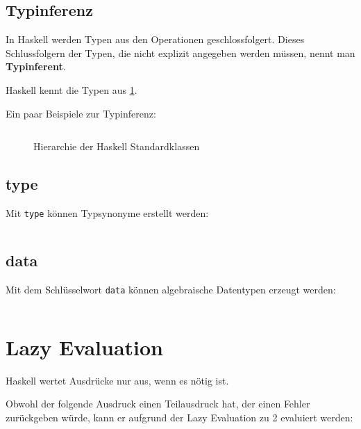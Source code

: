 \subsection{Typinferenz}
In Haskell werden Typen aus den Operationen geschlossfolgert. Dieses
Schlussfolgern der Typen, die nicht explizit angegeben werden müssen,
nennt man \textbf{Typinferent}.


Haskell kennt die Typen aus \cref{fig:haskell-type-hierarchy}.

Ein paar Beispiele zur Typinferenz:
\inputminted[numbersep=5pt, tabsize=4]{haskell}{scripts/haskell/typinferenz.sh}

\begin{figure}[htp]
    \centering
    \resizebox{0.9\linewidth}{!}{}
    \caption{Hierarchie der Haskell Standardklassen}
    \label{fig:haskell-type-hierarchy}
\end{figure}

\subsection{type}%
Mit \texttt{type} können Typsynonyme erstellt werden:

\inputminted[numbersep=5pt, tabsize=4]{haskell}{scripts/haskell/alt-types.hs}

\subsection{data}%
Mit dem Schlüsselwort \texttt{data} können algebraische Datentypen
erzeugt werden:

\inputminted[numbersep=5pt, tabsize=4]{haskell}{scripts/haskell/data-example.hs}

\section{Lazy Evaluation}%
Haskell wertet Ausdrücke nur aus, wenn es nötig ist.

\begin{beispiel}
    Obwohl der folgende Ausdruck einen Teilausdruck hat, der einen Fehler zurückgeben
    würde, kann er aufgrund der Lazy Evaluation zu 2 evaluiert werden:
    \inputminted[linenos, numbersep=5pt, tabsize=4, frame=lines, label=lazy-evaluation.hs]{haskell}{scripts/haskell/lazy-evaluation.hs}
\end{beispiel}

